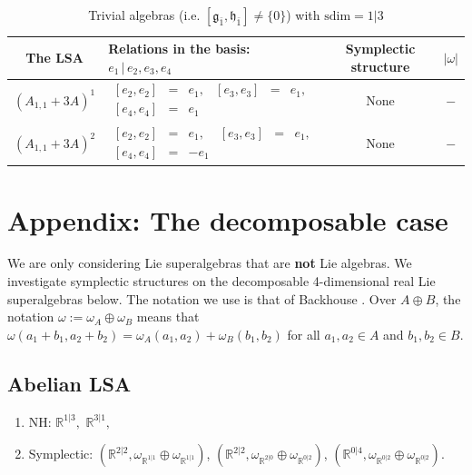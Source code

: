 \documentclass[12pt]{amsart}
\begin{document}
\footnotesize
\begin{table}[H]
\centering
\begin{tabular}{| c | l | c |c|}\hline
 The LSA & Relations in the basis: $e_1\,|\,e_2,e_3,e_4$ & Symplectic structure & $|\omega|$ \\ \hline
 $(A_{1,1}+3 A)^1$ & $
\begin{array}{lcrlcl}
[e_2, e_2]&=&e_1, & [e_3, e_3]&=&e_1,\\[1mm]
 [e_4, e_4]&=&e_1
\end{array}$ & None & $-$\\ \hline
$(A_{1,1}+3 A)^2$ & $
\begin{array}{lcrlcl}
[e_2, e_2]&=&e_1, & [e_3, e_3]&=&e_1,\\[1mm]
 [e_4, e_4]&=&-e_1
\end{array}$ & None & $-$\\ \hline
\end{tabular}
\caption{Trivial algebras (i.e. $[\mathfrak{g}_{\bar 1}, \mathfrak{h}_{\bar 1}]\not =\{0\}$) with $\mathrm{sdim}=1|3$}\label{tab6}
\end{table}

\normalsize 

\section{Appendix: The decomposable case}
We are only considering Lie superalgebras that are {\bf not} Lie algebras. We investigate symplectic structures on the decomposable 4-dimensional real Lie superalgebras below. The notation we use is that of Backhouse \cite{B}. Over $A\oplus B$, the notation $\omega:=\omega_A \oplus \omega_B$ means that
$\omega(a_1+b_1,a_2+b_2)=\omega_A(a_1,a_2)+\omega_B(b_1,b_2)$ for all $a_1,a_2\in A$ and $b_1,b_2\in B$.

\subsection{Abelian LSA}

\begin{enumerate}
\item NH: $\mathbb{R}^{1|3},$ $\mathbb{R}^{3|1},$
\item Symplectic: $(\mathbb{R}^{2|2}, \omega_{\mathbb{R}^{1|1}} \oplus \omega_{\mathbb{R}^{1|1}})$,  $(\mathbb{R}^{2|2}, \omega_{\mathbb{R}^{2|0}} \oplus \omega_{\mathbb{R}^{0|2}})$, $(\mathbb{R}^{0|4},\omega_{\mathbb{R}^{0|2}} \oplus \omega_{\mathbb{R}^{0|2}}).$

\end{enumerate}
\end{document}

